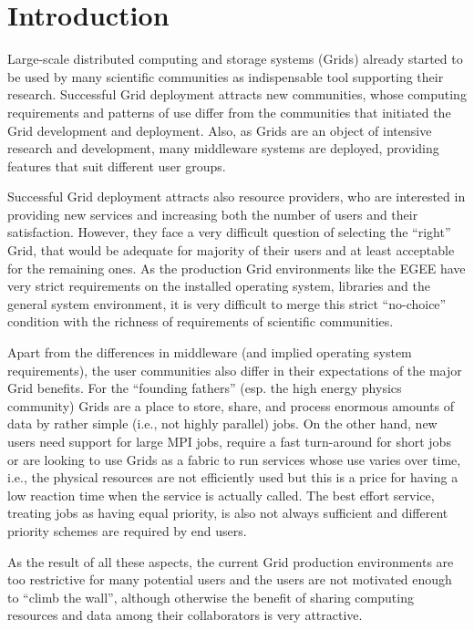 \documentclass{sig-alternate}
\begin{document}
\section{Introduction}
Large-scale distributed computing and storage systems (Grids)
already started to be used by many scientific communities as
indispensable tool supporting their research. Successful Grid deployment
attracts new communities, whose computing requirements and patterns of use
differ from the communities that initiated the Grid development and
deployment. Also, as Grids are an object of intensive research and
development, many middleware systems are deployed, providing
features that suit different user groups. 

Successful Grid deployment attracts also resource providers, who are
interested in providing new services and increasing both the number of users
and their satisfaction. However, they face a very difficult question of
selecting the ``right'' Grid, that would be adequate for majority of
their users and at least acceptable for the remaining ones. As the
production Grid environments like the EGEE have very strict requirements
on the installed operating system, libraries and the general system
environment, it is very difficult to merge this strict ``no-choice''
condition with the richness of requirements of scientific communities. 

Apart from the differences in middleware (and implied operating system
requirements), the user communities also differ in their expectations of the
major Grid benefits. For the ``founding fathers'' (esp. the high energy
physics community) Grids are a place to store, share, and process enormous
amounts of data by rather simple (i.e., not highly parallel) jobs. On the
other hand, new users need support for large MPI jobs, require a fast
turn-around for short jobs or are looking to use Grids as a fabric to run
services whose use varies over time, i.e., the physical resources are not
efficiently used but this is a price for having a low reaction time when the
service is actually called. The best effort service, treating jobs as having
equal priority, is also not always sufficient and different priority schemes
are required by end users.

As the result of all these aspects, the current Grid production
environments are too restrictive for many potential users and the users are
not motivated enough to ``climb the wall'', although otherwise the benefit
of sharing computing resources and data among their collaborators is very
attractive.
\end{document}
